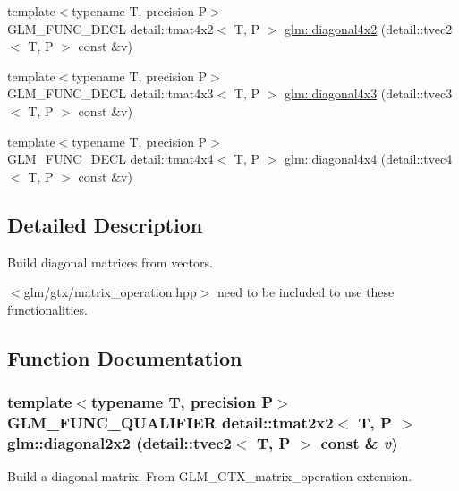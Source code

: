 \begin{CompactItemize}
\item 
{\footnotesize template$<$typename T, precision P$>$ }\\GLM\_\-FUNC\_\-DECL detail::tmat4x2$<$ T, P $>$ \hyperlink{group__gtx__matrix__operation_ge32f9a70411084d4b33464c23b04c997}{glm::diagonal4x2} (detail::tvec2$<$ T, P $>$ const \&v)
\item 
{\footnotesize template$<$typename T, precision P$>$ }\\GLM\_\-FUNC\_\-DECL detail::tmat4x3$<$ T, P $>$ \hyperlink{group__gtx__matrix__operation_g9b918f5e6a6224398447d2c79861d8fd}{glm::diagonal4x3} (detail::tvec3$<$ T, P $>$ const \&v)
\item 
{\footnotesize template$<$typename T, precision P$>$ }\\GLM\_\-FUNC\_\-DECL detail::tmat4x4$<$ T, P $>$ \hyperlink{group__gtx__matrix__operation_g32c8da8ef592e0c0891d1593ffb524db}{glm::diagonal4x4} (detail::tvec4$<$ T, P $>$ const \&v)
\end{CompactItemize}


\subsection{Detailed Description}
Build diagonal matrices from vectors. 

$<$glm/gtx/matrix\_\-operation.hpp$>$ need to be included to use these functionalities. 

\subsection{Function Documentation}
\hypertarget{group__gtx__matrix__operation_g8f6e3292b609cd9d959446d808ca3746}{
\subsubsection[diagonal2x2]{\setlength{\rightskip}{0pt plus 5cm}template$<$typename T, precision P$>$ GLM\_\-FUNC\_\-QUALIFIER detail::tmat2x2$<$ T, P $>$ glm::diagonal2x2 (detail::tvec2$<$ T, P $>$ const \& {\em v})}}
\label{group__gtx__matrix__operation_g8f6e3292b609cd9d959446d808ca3746}


Build a diagonal matrix. From GLM\_\-GTX\_\-matrix\_\-operation extension. 

